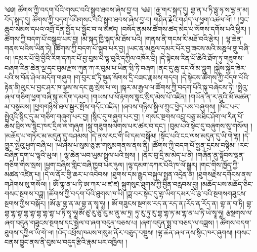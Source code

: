 \setcounter{footnote}{0} 
༄༅། ཚོགས་ཀྱི་བདག་པོའི་གསང་བའི་སྒྲུབ་ཐབས་ཞེས་བྱ་བ། ༄༅། །རྒྱ་གར་སྐད་དུ། གྷ་ན་པ་ཏི་ཧྥུ་ཧ་ས་དྷ་ན་མ། བོད་སྐད་དུ། ཚོགས་ཀྱི་བདག་པོའིགསང་བའི་སྒྲུབ་ཐབས་ཞེས་བྱ་བ། གཤིན་རྗེའི་གཤེད་ལ་ཕྱག་འཚལ་ལོ། ། །བྱང་ཆུབ་སེམས་དཔའ་འགྲོ་དོན་སྤྱོད་པ་སྦྱོང་བ་ལ་མཛད། །བསོད་ནམས་ཚོགས་ཚད་མེད་པ་སོགས་དགོས་པའི་ཕྱིར། ། ཚོགས་ཀྱི་བདག་པོ་བསྒྲུབ་པར་བྱ། །མི་སྐད་ཁྱི་སྐད་མི་ཐོས་པའི། །གནས་ནི་གངས་རི་མཐོ་བའི་རྩེར། ། ལྷ་ཆེན་གནས་པའིས་ཡིན་ཏེ། །ཚོགས་ཀྱི་བདག་པོ་སྒྲུབ་པར་བྱ། །ཡང་ན་མཎྜལ་དམར་པོར་བྱ་ཟངས་མའི་མཎྜལ་གྲུ་བཞི་ལ། །དམར་པོ་བྲི་བྱིའི་རིག་དཀར་པོ་བྱ་བུམ་པ་ལྟ་བུའི་དཀྱིལ་འཁོར་བྲི། །དེ་སྟེངས་རིན་པོ་ཆེའི་ཐོག་ཏུ་གཟུགས་བཞག་རིན་ཆེན་ལྔ་དང་བུམ་རྫས་ཀུན་ཀ་ར་བུམ་པ་ཡིན་ཝི་ཏི་བཞག །ནང་དུ་ཆུ་དང་འོ་མ་བླུག །སྐྱེས་སྐྱེད་ཟེར་པའི་ས་བོན་ཤེལ་མདོག་གཞུག །ག་བུར་ཛ་ཏི་སྔུན་སོགས་དྲི་བཟང་རྣམས་གདབ། །དེ་སྟེངས་ཚོགས་ཀྱི་བདག་པོའི་རྟེན་ནི།ལུང་པ་བྱང་ཤར་ཁ་ལྟས་ས་དང་ཆུ་སྲེས་པ་ལ། །སྐར་མ་རྒྱལ་ལ་ཚོགས་ཀྱི་བདག་པོའི་སྐུ་བཞེངས་ཏེ། །སྤྲེའུ་ཞལ་གཅིག་ཕྱག་བཞི་སྐུ་མདོག་དམར། །གཡས་པ་ཕོ་རྟགས་སྣང་སྲིད་མེས་པོ་འཛིན། །གཡོན་ན་ར་ནུའི་མོ་མཚན་མ་བསྣམས། །ཕྱགགཉིས་ཐལ་སྦྱར་སྤོས་གདོང་འཛིན། །ཞབས་གཉིས་སྐྱིལ་ཀྲུང་ཕྱེད་པས་བཞུགས། །ཁོང་པར་སྤྲེའུའི་སྙིང་དུ་མ་གཅིག་གཞུག་པར་བྱ། །སྙིང་དུ་གཞུག་པར་བྱ། ། གསང་སྔགས་འབྲུ་བཅུ་མཐིང་ཤོག་ལ་རིན་པོ་ཆེས་བྲིས་ལ་སྙིང་ཁར་དྲིལ་ལ་གཞུག །སྐུ་གཟུགསལེགས་པར་ཚར་བ་དང་། །བུམ་པའི་སྟེང་དུ་བཞུགས་སུ་གསོལ། ། །མཆོད་པ་གཏོར་མ་མདུན་དུ་བཤམས། །དེ་ནས་རང་གི་ཡི་དམ་བསྒོམ། །སྟོང་པའི་ངང་ལས་མདུན་དུ་ཡི་གེ་གྷ། །དེ་གྱུར་སྤྲེའུ་ཕྱག་བཞི་པ། །ཡེ་ཤེས་པ་སུམ་ཅུ་རྩ་གསུམགནས་ནས་ནི། །ཚོགས་ཀྱི་བདག་པོ་སྤྱན་དྲངས་བསྟིམ། །རང་བཞིན་དག་པ་ལྷའི་ཡུལ། ། ལྷ་ཆེན་ཡབ་ཡུམ་སྤྲུལ་པའི་སྲས། ། །ནོར་བུ་དྲི་མ་མེད་པ་ནི། །གཞོན་ནུ་སྟོབས་ལྡན་གཅིག་གིས་སྲས། །ཕྱག་བཞིས་གླིང་བཞི་ཁྱབ་པར་ཉུལ། །ལྷ་དམག་དཀར་པོའི་ཁ་ལོ་སྒྱུར། །གང་གིས་ཁྱོད་ཀྱི་མཚན་འཛིན་པ། །དེ་ལ་ནོར་གྱི་ཆར་པ་འབེབས། །ཐུགས་དམ་རྒྱུད་བསྐུལ་སྤྱན་འདྲེན་ན། །ཐུགསརྗེས་དགོངས་ནས་གཤེགས་སུ་གསོལ། ། ཨོཾ་གྷ་ན་པ་ཏི་ཨ་ཀར་ཡ་ཛ་ཛ། སྐུགསུང་ཐུགས་ཀྱི་བྱིན་བརླབས་བྱ། །མཆོད་པས་མཆོད་ཅིང་གསང་སྔགས་བཟླ། །ཚོགས་ཀྱི་བདག་པོའི་ཐུགས་ཁ་ཡི། །ཟླ་བར་སྟེང་དུ་གྷ་ཡིག་དམར་པོ་རྩ་བའི་སྔགསགཟུངས་སྔགས་ཀྱིས་བསྐོར། །ཨོ་རྩ་གྷ་ན་མ་གྷ་ན་སྭཱ་ཧཱ། ། ཨོ་གཟུངས་སྔགས་རད་ན་རད་ན༑རོད་ན་རོད་ན། གྷ་ན་བ་ཏི། གྷ་གྷ་གྷ་གྷ་གྷ་གྷ་གྷ་གྷ་གྷ་པ་ཏི་སྭཱ་ཧཱ།ཨོཾ་ཙུ་རུ་ཙུ་རུ་མ་ནུ་མ་ཏྲ། ཏུ་རུ་ཏུ་རུ་གྷ་གྷ་ཏ་མ་གྷ་ན་པ་ཏི་ཡེ་སྭཱ་ཧཱ། རྩསྔགས་ལ་ཞག་བདུན་གཟུངས་སྔགས་དང་སྦྲེལ་བ་ཞག་བདུན་བཅས་པ། །ཞག་བདུན་སྨྲ་བ་བཅད་ལ་བཟླས། ། ཚོགས་བདག་ཐུགས་དཀྱིལ་ཡི་གེ་ལ། །འོད་འཕྲོས་ཁམས་གསུམ་ནོར་བཅུད་བསྡུས། །ལྷ་ཆེན་ཞལ་ནས་སྙིང་ཁར་ཞུགས། །གསང་བནས་བྱུང་ནས་ནི་བུམ་པ་བདུད་རྩིའི་རྣམ་པར་འཁྱིལ། །
